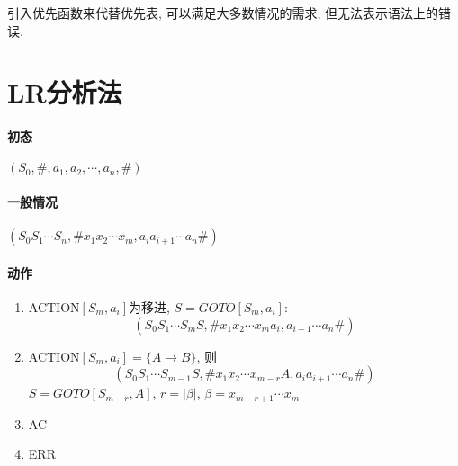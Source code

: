             引入优先函数来代替优先表, 可以满足大多数情况的需求, 但无法表示语法上的错误.

    \section{LR分析法}

        \paragraph{初态}

            $(S_0, \#, a_1,a_2, \cdots, a_n, \#)$

        \paragraph{一般情况}

            $(S_0S_1\cdots S_n, \#x_1x_2\cdots x_m, a_ia_{i+1}\cdots a_n\#)$

        \paragraph{动作}

            \begin{enumerate}
                \item ACTION$[S_m,a_i]$为移进, $S=GOTO[S_m,a_i]$:
                    \[(S_0S_1\cdots S_mS, \#x_1x_2\cdots x_ma_i, a_{i+1}\cdots a_n\#)\]
                \item ACTION$[S_m,a_i]=\{A\to B\}$, 则
                    \[(S_0S_1\cdots S_{m-1}S, \#x_1x_2\cdots x_{m-r}A, a_ia_{i+1}\cdots a_n\#)\]
                    $S=GOTO[S_{m-r},A]$, $r=|\beta|$, $\beta=x_{m-r+1}\cdots x_m$
                \item AC
                \item ERR
            \end{enumerate}


                
